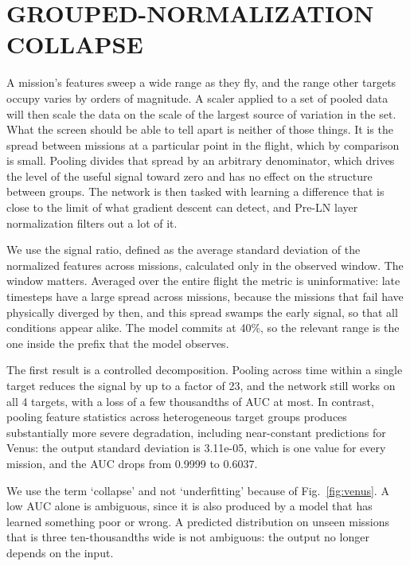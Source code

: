 \documentclass{IEEEtaes}
\begin{document}
\section{GROUPED-NORMALIZATION COLLAPSE}
\label{sec:collapse}

A mission's features sweep a wide range as they fly, and the range other targets occupy varies by orders of magnitude. A scaler applied to a set of pooled data will then scale the data on the scale of the largest source of variation in the set. What the screen should be able to tell apart is neither of those things. It is the spread between missions at a particular point in the flight, which by comparison is small. Pooling divides that spread by an arbitrary denominator, which drives the level of the useful signal toward zero and has no effect on the structure between groups. The network is then tasked with learning a difference that is close to the limit of what gradient descent can detect, and Pre-LN layer normalization filters out a lot of it.

We use the signal ratio, defined as the average standard deviation of the normalized features across missions, calculated only in the observed window. The window matters. Averaged over the entire flight the metric is uninformative: late timesteps have a large spread across missions, because the missions that fail have physically diverged by then, and this spread swamps the early signal, so that all conditions appear alike. The model commits at 40\%, so the relevant range is the one inside the prefix that the model observes.

The first result is a controlled decomposition. Pooling across time within a single target reduces the signal by up to a factor of 23, and the network still works on all 4 targets, with a loss of a few thousandths of AUC at most. In contrast, pooling feature statistics across heterogeneous target groups produces substantially more severe degradation, including near-constant predictions for Venus: the output standard deviation is 3.11e-05, which is one value for every mission, and the AUC drops from 0.9999 to 0.6037.

We use the term `collapse' and not `underfitting' because of Fig.~\ref{fig:venus}. A low AUC alone is ambiguous, since it is also produced by a model that has learned something poor or wrong. A predicted distribution on unseen missions that is three ten-thousandths wide is not ambiguous: the output no longer depends on the input.
\end{document}
